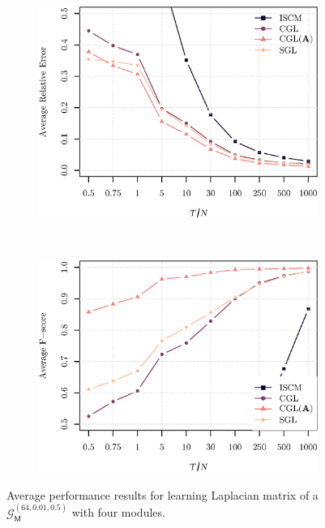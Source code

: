 \begin{figure}[!htb]
    \centering
    \begin{subfigure}[b]{0.47\textwidth}
      \includegraphics[width=\textwidth]{modular/latex/figures/relative_error_modular.eps}
    \end{subfigure}
    ~ %
    \begin{subfigure}[b]{0.47\textwidth}
        \includegraphics[width=\textwidth]{modular/latex/figures/fscore_modular.eps}
    \end{subfigure}
    \caption{Average performance results for learning Laplacian matrix of a $\mathcal{G}^{(64, 0.01, 0.5)}_{\mathsf{M}}$
    with four modules.}
    \label{fig:performance-modular}
\end{figure}

